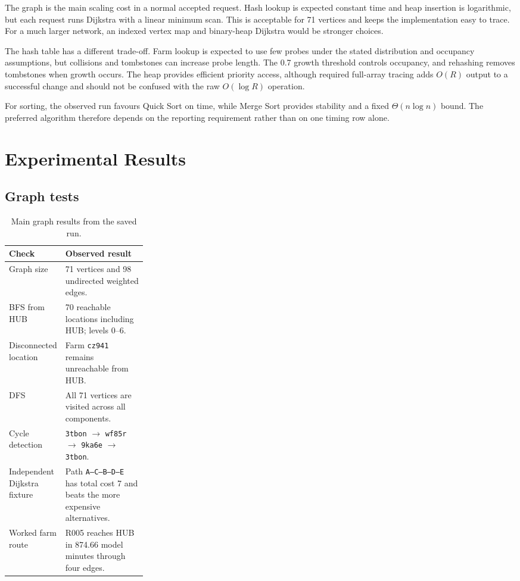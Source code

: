 \documentclass[10pt,a4paper]{article}
\begin{document}
The graph is the main scaling cost in a normal accepted request. Hash lookup is expected constant time and heap insertion is logarithmic, but each request runs Dijkstra with a linear minimum scan. This is acceptable for 71 vertices and keeps the implementation easy to trace. For a much larger network, an indexed vertex map and binary-heap Dijkstra would be stronger choices.

The hash table has a different trade-off. Farm lookup is expected to use few probes under the stated distribution and occupancy assumptions, but collisions and tombstones can increase probe length. The 0.7 growth threshold controls occupancy, and rehashing removes tombstones when growth occurs. The heap provides efficient priority access, although required full-array tracing adds $O(R)$ output to a successful change and should not be confused with the raw $O(\log R)$ operation.

For sorting, the observed run favours Quick Sort on time, while Merge Sort provides stability and a fixed $\Theta(n\log n)$ bound. The preferred algorithm therefore depends on the reporting requirement rather than on one timing row alone.

\section{Experimental Results}

\subsection{Graph tests}

\begin{table}[!htbp]
\centering
\small
\caption{Main graph results from the saved run.}
\label{tab:graph-results}
\begin{tabularx}{\linewidth}{|L{0.27\linewidth}|Y|}
\hline
\textbf{Check} & \textbf{Observed result} \\
\hline
Graph size & 71 vertices and 98 undirected weighted edges. \\
\hline
BFS from HUB & 70 reachable locations including HUB; levels 0--6. \\
\hline
Disconnected location & Farm \texttt{cz941} remains unreachable from HUB. \\
\hline
DFS & All 71 vertices are visited across all components. \\
\hline
Cycle detection & \texttt{3tbon} $\rightarrow$ \texttt{wf85r} $\rightarrow$ \texttt{9ka6e} $\rightarrow$ \texttt{3tbon}. \\
\hline
Independent Dijkstra fixture & Path \texttt{A--C--B--D--E} has total cost 7 and beats the more expensive alternatives. \\
\hline
Worked farm route & R005 reaches HUB in 874.66 model minutes through four edges. \\
\hline
\end{tabularx}
\end{table}
\end{document}
